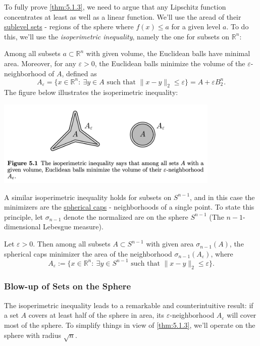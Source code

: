 To fully prove \cref{thm:5.1.3}, we need to argue that any Lipschitz function concentrates at least as well 
as a linear function. We'll use the aread of their \underline{sublevel sets} - regions of the sphere where 
$f(x) \leq a$ for a given level $a$. To do this, we'll use the \textit{isoperimetric inequality}, namely 
the one for subsets on $\mathbb{R}^n$: 

\begin{theorem}
\label{thm:5.1.4}
Among all subsets $a \subset \mathbb{R}^n$ with given volume, the Euclidean balls have minimal area. Moreover, 
for any $\varepsilon > 0$, the Euclidean balls minimize the volume of the $\varepsilon$-neighborhood of $A$, 
defined as 
\[ A_{\varepsilon} = \{ x \in \mathbb{R}^n: \ \exists y \in A \text{ such that } \lVert x - y \rVert_{2} 
\leq \varepsilon \} = A + \varepsilon B_2^n. \] 
The figure below illustrates the isoperimetric inequality:
\begin{center}
	\includegraphics[width=0.8\textwidth]{Chapter 5/fig5-1.png}
\end{center}
\end{theorem}

A similar isoperimetric inequality holds for subsets on $S^{n - 1}$, and in this case the minimizers are the 
\underline{spherical caps} - neighborhoods of a single point. To state this principle, let $\sigma_{n - 1}$ 
denote the normalized are on the sphere $S^{n - 1}$ (The $n - 1$-dimensional Lebesgue measure).

\begin{theorem}
\label{thm:5.1.5}
Let $\varepsilon > 0$. Then among all subsets $A \subset S^{n - 1}$ with given area $\sigma_{n - 1}(A)$, the 
spherical caps minimizer the area of the neighborhood $\sigma_{n - 1}(A_{\varepsilon})$, where 
\[ A_{\varepsilon} := \{ x \in \mathbb{R}^n: \ \exists y \in S^{n - 1} \text{ such that } 
\lVert x - y \rVert_{2} \leq \varepsilon \}. \]
\end{theorem}


\subsubsection{Blow-up of Sets on the Sphere}
The isoperimetric inequality leads to a remarkable and counterintuitive result: if a set $A$ covers at least 
half of the sphere in area, its $\varepsilon$-neighborhood $A_{\varepsilon}$ will cover most of the sphere. 
To simplify things in view of \cref{thm:5.1.3}, we'll operate on the sphere with radius $\sqrt{n}$.


